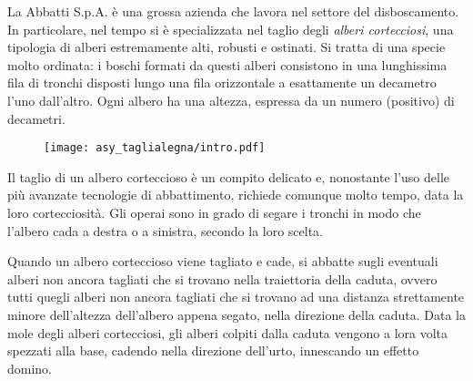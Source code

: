 \usepackage{tabularx}
\usepackage{booktabs}
\usepackage{xcolor}
\usepackage{afterpage}
\usepackage{pifont,mdframed}
\usepackage{framed}
\usepackage[bottom]{footmisc}
\usepackage{caption}
\usepackage[colorlinks=true, linkcolor=true, urlcolor=blue]{hyperref}


\makeatletter
\gdef\this@inputfilename{input.txt}
\gdef\this@outputfilename{output.txt}
\makeatother

\newenvironment{warning}
  {\par\begin{mdframed}[linewidth=2pt,linecolor=gray]%
    \begin{list}{}{\leftmargin=1cm
                   \labelwidth=\leftmargin}\item[\Large\ding{43}]}
  {\end{list}\end{mdframed}\par}

\newcommand{\inputfile}{\texttt{input.txt}}
\newcommand{\outputfile}{\texttt{output.txt}}


La Abbatti S.p.A. è una grossa azienda che lavora nel settore del disboscamento. In particolare, nel tempo si è specializzata nel taglio degli \emph{alberi cortecciosi}, una tipologia di alberi estremamente alti, robusti e ostinati. Si tratta di una specie molto ordinata: i boschi formati da questi alberi consistono in una lunghissima fila di tronchi disposti lungo una fila orizzontale a esattamente un decametro l'uno dall'altro. Ogni albero ha una altezza, espressa da un numero (positivo) di decametri.

\begin{figure}[h!]
  \centering
    \texttt{[image: asy\_taglialegna/intro.pdf]}\\
\end{figure}

Il taglio di un albero corteccioso è un compito delicato e, nonostante l'uso delle più avanzate tecnologie di abbattimento, richiede comunque molto tempo, data la loro cortecciosità. Gli operai sono in grado di segare i tronchi in modo che l'albero cada a destra o a sinistra, secondo la loro scelta.

Quando un albero corteccioso viene tagliato e cade, si abbatte sugli eventuali alberi non ancora tagliati che si trovano nella traiettoria della caduta, ovvero tutti quegli alberi non ancora tagliati che si trovano ad una distanza strettamente minore dell'altezza dell'albero appena segato, nella direzione della caduta. Data la mole degli alberi cortecciosi, gli alberi colpiti dalla caduta vengono a lora volta spezzati alla base, cadendo nella direzione dell'urto, innescando un effetto domino.

